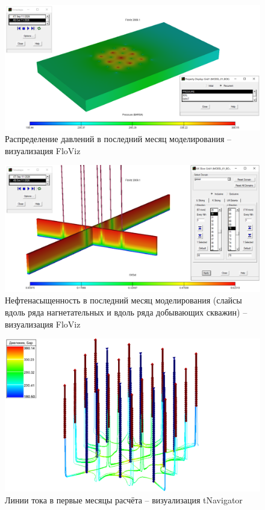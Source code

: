 \documentclass[a4paper,12pt]{article}
\begin{document}
\begin{figure}[H]
\center
\includegraphics[width=\textwidth]{ecl_pressure_box_model}
\caption{Распределение давлений в последний месяц моделирования -- визуализация FloViz}
\label{fig:ecl_pressure_box_model}
\end{figure}


\begin{figure}[H]
\center
\includegraphics[width=\textwidth]{ecl_oilsat_slices_box_model}
\caption{Нефтенасыщенность в последний месяц моделирования (слайсы вдоль ряда нагнетательных и вдоль ряда добывающих скважин) -- визуализация FloViz}
\label{fig:ecl_oilsat_slices_box_model}
\end{figure}


\begin{figure}[H]
\center
\includegraphics[width=\textwidth]{tnav_flow_lines_start_box_model}
\caption{Линии тока в первые месяцы расчёта -- визуализация tNavigator}
\label{fig:tnav_flow_lines_start_box_model}
\end{figure}
\end{document}
